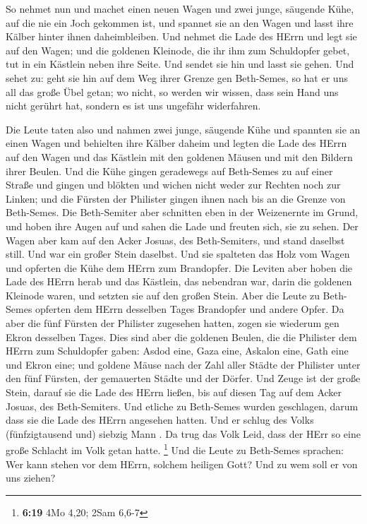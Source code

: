  So nehmet nun und machet einen neuen Wagen und zwei junge,
säugende Kühe, auf die nie ein Joch gekommen ist, und spannet sie an den
Wagen und lasst ihre Kälber hinter ihnen daheimbleiben.  Und
nehmet die Lade des HErrn und legt sie auf den Wagen; und die goldenen
Kleinode, die ihr ihm zum Schuldopfer gebet, tut in ein Kästlein neben
ihre Seite. Und sendet sie hin und lasst sie gehen.  Und
sehet zu: geht sie hin auf dem Weg ihrer Grenze gen Beth-Semes, so hat
er uns all das große Übel getan; wo nicht, so werden wir wissen, dass
sein Hand uns nicht gerührt hat, sondern es ist uns ungefähr
widerfahren.

 Die Leute taten also und nahmen zwei junge, säugende Kühe
und spannten sie an einen Wagen und behielten ihre Kälber daheim
 und legten die Lade des HErrn auf den Wagen und das
Kästlein mit den goldenen Mäusen und mit den Bildern ihrer Beulen.
 Und die Kühe gingen geradewegs auf Beth-Semes zu auf einer
Straße und gingen und blökten und wichen nicht weder zur Rechten noch
zur Linken; und die Fürsten der Philister gingen ihnen nach bis an die
Grenze von Beth-Semes.  Die Beth-Semiter aber schnitten
eben in der Weizenernte im Grund, und hoben ihre Augen auf und sahen die
Lade und freuten sich, sie zu sehen.  Der Wagen aber kam
auf den Acker Josuas, des Beth-Semiters, und stand daselbst still. Und
war ein großer Stein daselbst. Und sie spalteten das Holz vom Wagen und
opferten die Kühe dem HErrn zum Brandopfer.  Die Leviten
aber hoben die Lade des HErrn herab und das Kästlein, das nebendran war,
darin die goldenen Kleinode waren, und setzten sie auf den großen Stein.
Aber die Leute zu Beth-Semes opferten dem HErrn desselben Tages
Brandopfer und andere Opfer.  Da aber die fünf Fürsten der
Philister zugesehen hatten, zogen sie wiederum gen Ekron desselben
Tages.  Dies sind aber die goldenen Beulen, die die
Philister dem HErrn zum Schuldopfer gaben: Asdod eine, Gaza eine,
Askalon eine, Gath eine und Ekron eine;  und goldene Mäuse
nach der Zahl aller Städte der Philister unter den fünf Fürsten, der
gemauerten Städte und der Dörfer. Und Zeuge ist der große Stein, darauf
sie die Lade des HErrn ließen, bis auf diesen Tag auf dem Acker Josuas,
des Beth-Semiters.  Und etliche zu Beth-Semes wurden
geschlagen, darum dass sie die Lade des HErrn angesehen hatten. Und er
schlug des Volks (fünfzigtausend und) siebzig Mann . Da trug das Volk
Leid, dass der HErr so eine große Schlacht im Volk getan hatte.
\footnote{\textbf{6:19} 4Mo 4,20; 2Sam 6,6-7}  Und die
Leute zu Beth-Semes sprachen: Wer kann stehen vor dem HErrn, solchem
heiligen Gott? Und zu wem soll er von uns ziehen?

